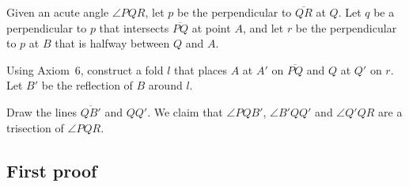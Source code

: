 Given an acute angle $\angle PQR$, let $p$ be the perpendicular to $\overline{QR}$ at $Q$. Let $q$ be a perpendicular to $p$ that intersects $\overline{PQ}$ at point $A$, and let $r$ be the perpendicular to $p$ at $B$ that is halfway between $Q$ and $A$.

Using Axiom~6, construct a fold $l$ that places $A$ at $A'$ on $\overline{PQ}$ and $Q$ at $Q'$ on $r$. Let $B'$ be the reflection of $B$ around $l$.

Draw the lines $\overline{QB'}$ and $QQ'$. We claim that $\angle PQB'$, $\angle B'QQ'$ and $\angle Q'QR$ are a trisection of $\angle PQR$.

\subsection{First proof}

